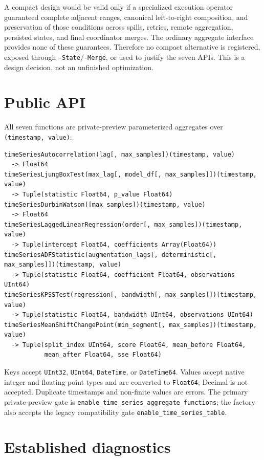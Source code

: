 \documentclass[11pt]{article}
\begin{document}
A compact design would be valid only if a specialized execution operator guaranteed complete adjacent ranges, canonical left-to-right composition, and preservation of those conditions across spills, retries, remote aggregation, persisted states, and final coordinator merges. The ordinary aggregate interface provides none of these guarantees. Therefore no compact alternative is registered, exposed through \texttt{-State}/\texttt{-Merge}, or used to justify the seven APIs. This is a design decision, not an unfinished optimization.

\section{Public API}

All seven functions are private-preview parameterized aggregates over \texttt{(timestamp, value)}:
\begin{lstlisting}[language={}]
timeSeriesAutocorrelation(lag[, max_samples])(timestamp, value)
  -> Float64
timeSeriesLjungBoxTest(max_lag[, model_df[, max_samples]])(timestamp, value)
  -> Tuple(statistic Float64, p_value Float64)
timeSeriesDurbinWatson([max_samples])(timestamp, value)
  -> Float64
timeSeriesLaggedLinearRegression(order[, max_samples])(timestamp, value)
  -> Tuple(intercept Float64, coefficients Array(Float64))
timeSeriesADFStatistic(augmentation_lags[, deterministic[, max_samples]])(timestamp, value)
  -> Tuple(statistic Float64, coefficient Float64, observations UInt64)
timeSeriesKPSSTest(regression[, bandwidth[, max_samples]])(timestamp, value)
  -> Tuple(statistic Float64, bandwidth UInt64, observations UInt64)
timeSeriesMeanShiftChangePoint(min_segment[, max_samples])(timestamp, value)
  -> Tuple(split_index UInt64, score Float64, mean_before Float64,
           mean_after Float64, sse Float64)
\end{lstlisting}

Keys accept \texttt{UInt32}, \texttt{UInt64}, \texttt{DateTime}, or \texttt{DateTime64}. Values accept native integer and floating-point types and are converted to \texttt{Float64}; Decimal is not accepted. Duplicate timestamps and non-finite values are errors. The primary private-preview gate is \texttt{enable\_time\_series\_aggregate\_functions}; the factory also accepts the legacy compatibility gate \texttt{enable\_time\_series\_table}.

\section{Established diagnostics}
\end{document}
